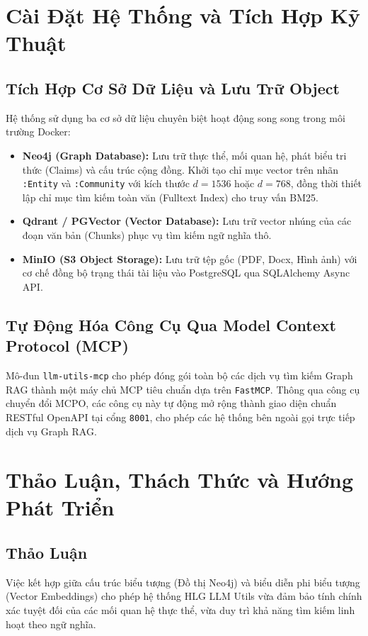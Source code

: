 \documentclass[11pt,a4paper]{report}
\begin{document}
\chapter{Cài Đặt Hệ Thống và Tích Hợp Kỹ Thuật}

\section{Tích Hợp Cơ Sở Dữ Liệu và Lưu Trữ Object}
Hệ thống sử dụng ba cơ sở dữ liệu chuyên biệt hoạt động song song trong môi trường Docker:
\begin{itemize}
    \item \textbf{Neo4j (Graph Database):} Lưu trữ thực thể, mối quan hệ, phát biểu tri thức (Claims) và cấu trúc cộng đồng. Khởi tạo chỉ mục vector trên nhãn \texttt{:Entity} và \texttt{:Community} với kích thước $d=1536$ hoặc $d=768$, đồng thời thiết lập chỉ mục tìm kiếm toàn văn (Fulltext Index) cho truy vấn BM25.
    \item \textbf{Qdrant / PGVector (Vector Database):} Lưu trữ vector nhúng của các đoạn văn bản (Chunks) phục vụ tìm kiếm ngữ nghĩa thô.
    \item \textbf{MinIO (S3 Object Storage):} Lưu trữ tệp gốc (PDF, Docx, Hình ảnh) với cơ chế đồng bộ trạng thái tài liệu vào PostgreSQL qua SQLAlchemy Async API.
\end{itemize}

\section{Tự Động Hóa Công Cụ Qua Model Context Protocol (MCP)}
Mô-đun \texttt{llm-utils-mcp} cho phép đóng gói toàn bộ các dịch vụ tìm kiếm Graph RAG thành một máy chủ MCP tiêu chuẩn dựa trên \texttt{FastMCP}. Thông qua công cụ chuyển đổi MCPO, các công cụ này tự động mở rộng thành giao diện chuẩn RESTful OpenAPI tại cổng \texttt{8001}, cho phép các hệ thống bên ngoài gọi trực tiếp dịch vụ Graph RAG.

\chapter{Thảo Luận, Thách Thức và Hướng Phát Triển}

\section{Thảo Luận}
Việc kết hợp giữa cấu trúc biểu tượng (Đồ thị Neo4j) và biểu diễn phi biểu tượng (Vector Embeddings) cho phép hệ thống HLG LLM Utils vừa đảm bảo tính chính xác tuyệt đối của các mối quan hệ thực thể, vừa duy trì khả năng tìm kiếm linh hoạt theo ngữ nghĩa.
\end{document}
